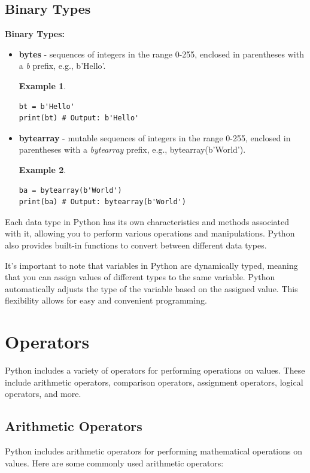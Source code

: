 \documentclass[12pt]{article}
\newtheorem{Example}{Example}[section]
\begin{document}
\subsection{Binary Types}
\textbf{Binary Types:}
\begin{itemize}
\item \textbf{bytes} - sequences of integers in the range 0-255, enclosed in parentheses with a \textit{b} prefix, e.g., b'Hello'.
\begin{Example}
\begin{lstlisting}
bt = b'Hello'
print(bt) # Output: b'Hello'
\end{lstlisting}
\end{Example}
\item \textbf{bytearray} - mutable sequences of integers in the range 0-255, enclosed in parentheses with a \textit{bytearray} prefix, e.g., bytearray(b'World').
\begin{Example}
\begin{lstlisting}
ba = bytearray(b'World')
print(ba) # Output: bytearray(b'World')
\end{lstlisting}
\end{Example}
\end{itemize}



Each data type in Python has its own characteristics and methods associated with it, allowing you to perform various operations and manipulations. Python also provides built-in functions to convert between different data types.

It's important to note that variables in Python are dynamically typed, meaning that you can assign values of different types to the same variable. Python automatically adjusts the type of the variable based on the assigned value. This flexibility allows for easy and convenient programming.

\newpage
\section{Operators}
Python includes a variety of operators for performing operations on values. These include arithmetic operators, comparison operators, assignment operators, logical operators, and more.

\subsection{Arithmetic Operators}

Python includes arithmetic operators for performing mathematical operations on values. Here are some commonly used arithmetic operators:
\end{document}
